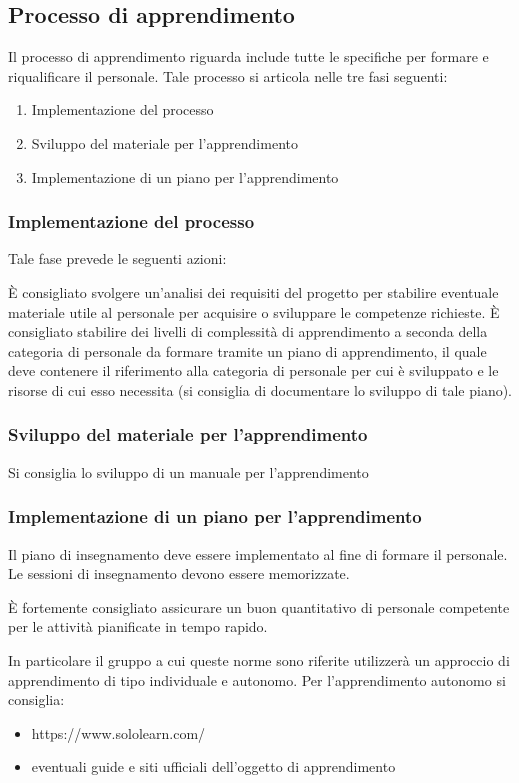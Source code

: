 \subsection{Processo di apprendimento}
Il processo di apprendimento riguarda include tutte le specifiche per formare e riqualificare il personale. Tale processo si articola nelle tre fasi seguenti:

\begin{enumerate}
    \item Implementazione del processo
    \item Sviluppo del materiale per l'apprendimento
    \item Implementazione di un piano per l'apprendimento
\end{enumerate}

\subsubsection{Implementazione del processo}Tale fase prevede le seguenti azioni:

\myparagraph{}\`E consigliato svolgere un'analisi dei requisiti del progetto per stabilire eventuale materiale utile al personale per acquisire o sviluppare le competenze richieste. \`E consigliato stabilire dei livelli di complessità di apprendimento a seconda della categoria di personale da  formare tramite un piano di apprendimento, il quale deve contenere il riferimento alla categoria di personale per cui è sviluppato e le risorse di cui esso necessita (si consiglia di documentare lo sviluppo di tale piano). 

\subsubsection{Sviluppo del materiale per l'apprendimento}

\myparagraph{}Si consiglia lo sviluppo di un manuale per l'apprendimento

\subsubsection{Implementazione di un piano per l'apprendimento}

\myparagraph{}Il piano di insegnamento deve essere implementato al fine di formare il personale. Le sessioni di insegnamento devono essere memorizzate.

\myparagraph{}\`E fortemente consigliato assicurare un buon quantitativo di personale competente per le attività pianificate in tempo rapido.

In particolare il gruppo a cui queste norme sono riferite utilizzerà un approccio di apprendimento di tipo individuale e autonomo. Per l'apprendimento autonomo si consiglia:
\begin{itemize}
    \item  https://www.sololearn.com/
    \item eventuali guide e siti ufficiali dell'oggetto di apprendimento
\end{itemize}